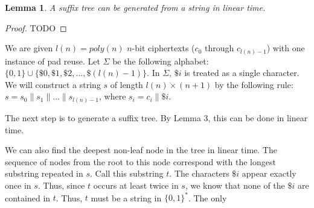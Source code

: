 \documentclass[11pt]{article}
\newtheorem{Lemma}{Lemma}
\begin{document}
\begin{Lemma}
A suffix tree can be generated from a string in linear time.
\end{Lemma}
\begin{proof}
TODO
\end{proof}

We are given $l(n) = poly(n)$ $n$-bit ciphertexts ($c_0$ through $c_{l(n) -1}$) with one instance of pad reuse. Let $\Sigma$ be the following alphabet: $\{0,1\}\cup \{\$0, \$1, \$2, ..., \$(l(n) - 1)\}$. In $\Sigma$, $\$i$ is treated as a single character. We will construct a string $s$ of length $l(n)\times (n+1)$ by the following rule: $s = s_0\|s_1\|...\|s_{l(n) -1}$, where $s_i = c_i \| \$i$.

The next step is to generate a suffix tree. By Lemma 3, this can be done in linear time. 

We can also find the deepest non-leaf node in the tree in linear time. The sequence of nodes from the root to this node correspond with the longest substring repeated in $s$. Call this substring $t$. The characters $\$i$ appear exactly once in $s$. Thus, since $t$ occurs at least twice in $s$, we know that none of the $\$i$ are contained in $t$. Thus, $t$ must be a string in $\{0,1\}^{*}$. The only
\end{document}
